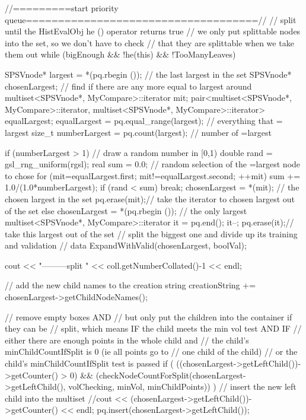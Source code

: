 \begin{DoxyCode}
{{        //=========start priority queue====================================//
        // split until the HistEvalObj he () operator returns true
        // we only put splittable nodes into the set, so we don't have to check
        // that they are splittable when we take them out   
      while (bigEnough && !he(this) && !TooManyLeaves) {          
            SPSVnode* largest = *(pq.rbegin ()); // the last largest in the set
            SPSVnode* chosenLargest;
            // find if there are any more equal to largest around
            multiset<SPSVnode*, MyCompare>::iterator mit;
            pair<multiset<SPSVnode*, MyCompare>::iterator,
                multiset<SPSVnode*, MyCompare>::iterator> equalLargest;
            equalLargest = pq.equal_range(largest); // everything that =
       largest
            size_t numberLargest = pq.count(largest); // number of =largest

            if (numberLargest > 1) {
                // draw a random number in [0,1)
                double rand = gsl_rng_uniform(rgsl);
                real sum = 0.0;
                // random selection of the =largest node to chose
                for (mit=equalLargest.first; mit!=equalLargest.second; ++mit) {
                    sum += 1.0/(1.0*numberLargest);
                    if (rand < sum) {
                        break;
                    }
                }
                chosenLargest = *(mit); // the chosen largest in the set
                pq.erase(mit);// take the iterator to chosen largest out of the
       set
            }
            else {
                chosenLargest = *(pq.rbegin ()); // the only largest
                multiset<SPSVnode*, MyCompare>::iterator it = pq.end();
                it--;
                pq.erase(it);// take this largest out of the set
            }
            // split the biggest one and divide up its training and validation 
            // data
            ExpandWithValid(chosenLargest, boolVal);
           
            cout << "---------split " << coll.getNumberCollated()-1 << endl;
                           
            // add the new child names to the creation string
            creationString += chosenLargest->getChildNodeNames();

        // remove empty boxes AND
        // but only put the children into the container if they can be
            // split, which means IF the child meets the min vol test AND IF
            // either there are enough points in the whole child and
                // the child's minChildCountIfSplit is 0 (ie all points go to
                // one child of the child)
            // or the child's minChildCountIfSplit test is passed
            if ( ((chosenLargest->getLeftChild())->getCounter() > 0) 
            && (checkNodeCountForSplit(chosenLargest->getLeftChild(),
                    volChecking, minVol, minChildPoints)) ) {
                // insert the new left child into the multiset
                //cout << (chosenLargest->getLeftChild())->getCounter()  <<
       endl;
                pq.insert(chosenLargest->getLeftChild());
            }

}}}
\end{DoxyCode}
